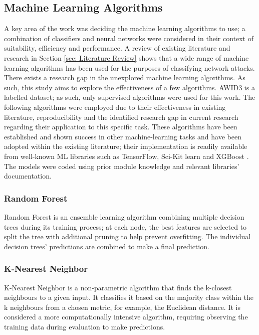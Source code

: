 
\subsection{Machine Learning Algorithms}

A key area of the work was deciding the machine learning algorithms to use; a combination of classifiers and neural networks were considered in their context of suitability, efficiency and performance. A review of existing literature and research in Section \ref{sec: Literature Review} shows that a wide range of machine learning algorithms has been used for the purposes of classifying network attacks. There exists a research gap in the unexplored machine learning algorithms. As such, this study aims to explore the effectiveness of a few algorithms. AWID3 is a labelled dataset; as such, only supervised algorithms were used for this work. The following algorithms were employed due to their effectiveness in existing literature, reproducibility and the identified research gap in current research regarding their application to this specific task. These algorithms have been established and shown success in other machine-learning tasks and have been adopted within the existing literature; their implementation is readily available from well-known ML libraries such as TensorFlow, Sci-Kit learn and XGBoost \parencite{scikit-learn, tensorflow2015-whitepaper, XGBoost}. The models were coded using prior module knowledge and relevant libraries' documentation.


\subsubsection{Random Forest}

Random Forest is an ensemble learning algorithm combining multiple decision trees during its training process; at each node, the best features are selected to split the tree with additional pruning to help prevent overfitting. The individual decision trees' predictions are combined to make a final prediction.

\subsubsection{K-Nearest Neighbor}

K-Nearest Neighbor is a non-parametric algorithm that finds the k-closest neighbours to a given input. It classifies it based on the majority class within the k neighbours from a chosen metric, for example, the Euclidean distance. It is considered a more computationally intensive algorithm, requiring observing the training data during evaluation to make predictions. 

